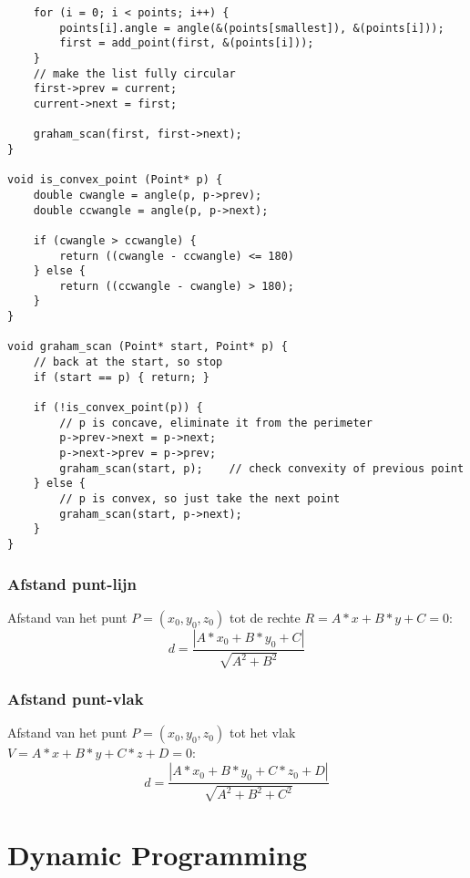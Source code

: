\documentclass[a4paper,10pt,oneside]{report}
\begin{document}
\begin{verbatim}
    for (i = 0; i < points; i++) {
        points[i].angle = angle(&(points[smallest]), &(points[i]));
        first = add_point(first, &(points[i]));
    }
    // make the list fully circular
    first->prev = current;
    current->next = first;
	
	graham_scan(first, first->next);
}

void is_convex_point (Point* p) {
    double cwangle = angle(p, p->prev);
    double ccwangle = angle(p, p->next);

    if (cwangle > ccwangle) {
        return ((cwangle - ccwangle) <= 180)
    } else {
        return ((ccwangle - cwangle) > 180);
    }
}

void graham_scan (Point* start, Point* p) {
    // back at the start, so stop
    if (start == p) { return; }

    if (!is_convex_point(p)) {
        // p is concave, eliminate it from the perimeter
        p->prev->next = p->next;
        p->next->prev = p->prev;
        graham_scan(start, p);    // check convexity of previous point
    } else {
        // p is convex, so just take the next point
        graham_scan(start, p->next);
    }
}
\end{verbatim}

\subsection{Afstand punt-lijn}
Afstand van het punt $P=(x_0, y_0, z_0)$ tot de rechte $R=A*x+B*y+C=0$:
\begin{equation}
	d = \frac{|A * x_0 + B * y_0 + C|}{\sqrt{A^{2} + B^{2}}}
\end{equation}

\subsection{Afstand punt-vlak}
Afstand van het punt $P=(x_0, y_0, z_0)$ tot het vlak $V=A*x+B*y+C*z+D=0$:
\begin{equation}
	d = \frac{|A * x_0 + B * y_0 + C * z_0 + D|}{\sqrt{A^{2} + B^{2} + C^{2}}}
\end{equation}

\chapter{Dynamic Programming}
\end{document}
